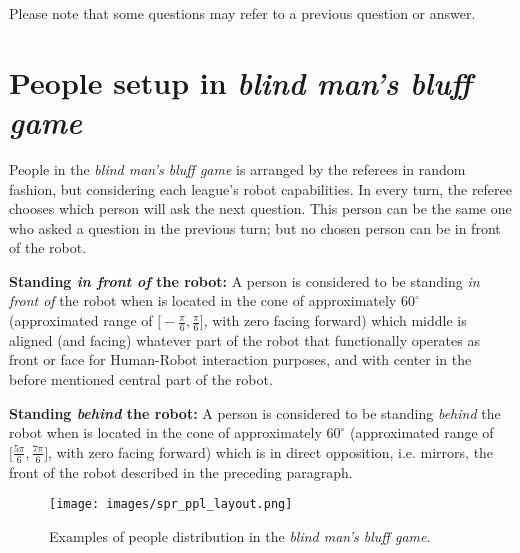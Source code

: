 Please note that some questions may refer to a previous question or answer.

\section{People setup in \textit{blind man's bluff game}}
People in the \textit{blind man's bluff game} is arranged by the referees in random fashion, but considering each league's robot capabilities. In every turn, the referee chooses which person will ask the next question. This person can be the same one who asked a question in the previous turn; but no chosen person can be in front of the robot.

\textbf{Standing \textit{in front of} the robot:} A person is considered to be standing \textit{in front of} the robot when is located in the cone of approximately $60^{\circ}$ (approximated range of $\big[-\frac{\pi}{6}, \frac{\pi}{6}\big]$, with zero facing forward) which middle is aligned (and facing) whatever part of the robot that functionally operates as front or face for Human-Robot interaction purposes, and with center in the before mentioned central part of the robot.

\textbf{Standing \textit{behind} the robot:} A person is considered to be standing \textit{behind} the robot when is located in the cone of approximately $60^{\circ}$ (approximated range of $\big[\frac{5\pi}{6}, \frac{7\pi}{6}\big]$, with zero facing forward) which is in direct opposition, i.e. mirrors, the front of the robot described in the preceding paragraph.

\begin{figure}[H]
    \begin{center}
        \texttt{[image: images/spr\_ppl\_layout.png]}
        \vspace{-10pt}
        \caption{Examples of people distribution in the \textit{blind man's bluff game}.}
        \label{fig:spr-ppl-layout}
    \end{center}
\end{figure}


